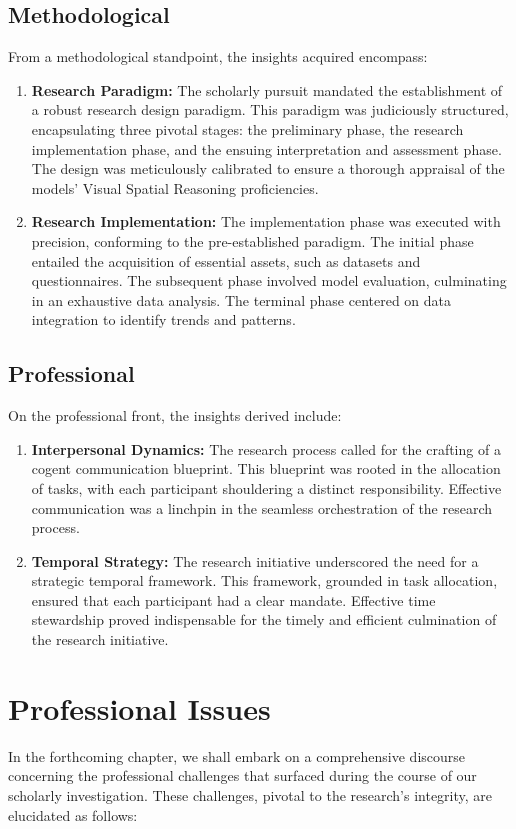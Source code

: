 \documentclass[twocolumn,11pt]{report}
\begin{document}
\section{Methodological}
From a methodological standpoint, the insights acquired encompass:
\begin{enumerate}
\item \textbf{Research Paradigm:} The scholarly pursuit mandated the establishment of a robust research design paradigm. This paradigm was judiciously structured, encapsulating three pivotal stages: the preliminary phase, the research implementation phase, and the ensuing interpretation and assessment phase. The design was meticulously calibrated to ensure a thorough appraisal of the models' Visual Spatial Reasoning proficiencies.
\item \textbf{Research Implementation:} The implementation phase was executed with precision, conforming to the pre-established paradigm. The initial phase entailed the acquisition of essential assets, such as datasets and questionnaires. The subsequent phase involved model evaluation, culminating in an exhaustive data analysis. The terminal phase centered on data integration to identify trends and patterns.
\end{enumerate}

\section{Professional}
On the professional front, the insights derived include:
\begin{enumerate}
\item \textbf{Interpersonal Dynamics:} The research process called for the crafting of a cogent communication blueprint. This blueprint was rooted in the allocation of tasks, with each participant shouldering a distinct responsibility. Effective communication was a linchpin in the seamless orchestration of the research process.
\item \textbf{Temporal Strategy:} The research initiative underscored the need for a strategic temporal framework. This framework, grounded in task allocation, ensured that each participant had a clear mandate. Effective time stewardship proved indispensable for the timely and efficient culmination of the research initiative.
\end{enumerate}

\chapter{Professional Issues}\label{chap:issues}
In the forthcoming chapter, we shall embark on a comprehensive discourse concerning the professional challenges that surfaced during the course of our scholarly investigation. These challenges, pivotal to the research's integrity, are elucidated as follows:
\end{document}
